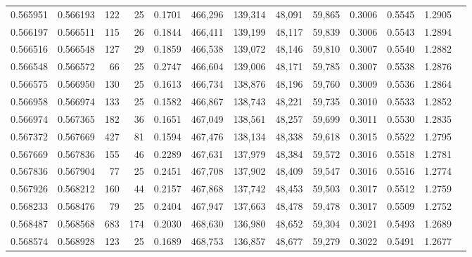 \begin{tabular}{rrrrrrrrrrrrr}
0.565951 & 0.566193 &   122 &  25 &                                     0.1701 & 466,296 & 139,314 &  48,091 &  59,865 & 0.3006 & 0.5545 & 1.2905 \\
0.566197 & 0.566511 &   115 &  26 &                                     0.1844 & 466,411 & 139,199 &  48,117 &  59,839 & 0.3006 & 0.5543 & 1.2894 \\
0.566516 & 0.566548 &   127 &  29 &                                     0.1859 & 466,538 & 139,072 &  48,146 &  59,810 & 0.3007 & 0.5540 & 1.2882 \\
0.566548 & 0.566572 &    66 &  25 &                                     0.2747 & 466,604 & 139,006 &  48,171 &  59,785 & 0.3007 & 0.5538 & 1.2876 \\
0.566575 & 0.566950 &   130 &  25 &                                     0.1613 & 466,734 & 138,876 &  48,196 &  59,760 & 0.3009 & 0.5536 & 1.2864 \\
0.566958 & 0.566974 &   133 &  25 &                                     0.1582 & 466,867 & 138,743 &  48,221 &  59,735 & 0.3010 & 0.5533 & 1.2852 \\
0.566974 & 0.567365 &   182 &  36 &                                     0.1651 & 467,049 & 138,561 &  48,257 &  59,699 & 0.3011 & 0.5530 & 1.2835 \\
0.567372 & 0.567669 &   427 &  81 &                                     0.1594 & 467,476 & 138,134 &  48,338 &  59,618 & 0.3015 & 0.5522 & 1.2795 \\
0.567669 & 0.567836 &   155 &  46 &                                     0.2289 & 467,631 & 137,979 &  48,384 &  59,572 & 0.3016 & 0.5518 & 1.2781 \\
0.567836 & 0.567904 &    77 &  25 &                                     0.2451 & 467,708 & 137,902 &  48,409 &  59,547 & 0.3016 & 0.5516 & 1.2774 \\
0.567926 & 0.568212 &   160 &  44 &                                     0.2157 & 467,868 & 137,742 &  48,453 &  59,503 & 0.3017 & 0.5512 & 1.2759 \\
0.568233 & 0.568476 &    79 &  25 &                                     0.2404 & 467,947 & 137,663 &  48,478 &  59,478 & 0.3017 & 0.5509 & 1.2752 \\
0.568487 & 0.568568 &   683 & 174 &                                     0.2030 & 468,630 & 136,980 &  48,652 &  59,304 & 0.3021 & 0.5493 & 1.2689 \\
0.568574 & 0.568928 &   123 &  25 &                                     0.1689 & 468,753 & 136,857 &  48,677 &  59,279 & 0.3022 & 0.5491 & 1.2677 \\

\end{tabular}
